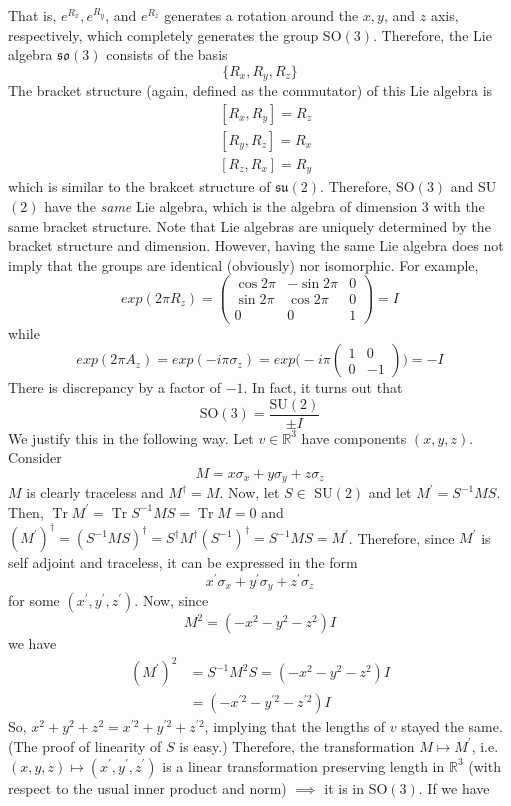 \documentclass{article}
\DeclareMathOperator{\Tr}{Tr}
\theoremstyle{remark}
\theoremstyle{definition}
\begin{document}
That is, $e^{R_x}, e^{R_y}$, and $e^{R_z}$ generates a rotation around the $x, y$, and $z$ axis, respectively, which completely generates the group SO$(3)$. Therefore, the Lie algebra $\mathfrak{so}(3)$ consists of the basis 
\[\{R_x, R_y, R_z\}\]
The bracket structure (again, defined as the commutator) of this Lie algebra is 
\begin{align*}
    & [R_x, R_y] = R_z \\
    & [R_y, R_z] = R_x \\
    & [R_z, R_x] = R_y
\end{align*}
which is similar to the brakcet structure of $\mathfrak{su}(2)$. Therefore, SO$(3)$ and SU$(2)$ have the \textit{same} Lie algebra, which is the algebra of dimension 3 with the same bracket structure. Note that Lie algebras are uniquely determined by the bracket structure and dimension. However, having the same Lie algebra does not imply that the groups are identical (obviously) nor isomorphic. For example, 
\[exp(2\pi R_z) = \begin{pmatrix}
\cos{2\pi} & -\sin{2\pi} & 0 \\
\sin{2\pi} & \cos{2\pi} & 0 \\
0 & 0 & 1
\end{pmatrix} = I\]
while 
\[exp(2\pi A_z) = 
exp(-i \pi \sigma_z) = exp \bigg(-i \pi \begin{pmatrix}
1&0\\0&-1
\end{pmatrix} \bigg) = -I\]
There is discrepancy by a factor of $-1$. In fact, it turns out that
\[\text{SO}(3) = \frac{\text{SU}(2)}{\pm I}\]
We justify this in the following way. Let $v \in \mathbb{R}^3$ have components $(x, y, z)$. Consider
\[M = x \sigma_x + y \sigma_y + z \sigma_z\]
$M$ is clearly traceless and $M^\dagger = M$. Now, let $S \in$ SU$(2)$ and let $M^\prime = S^{-1} M S$. Then, $\Tr{M^\prime} = \Tr{S^{-1} M S} = \Tr{M} = 0$ and $(M^\prime)^\dagger = (S^{-1} M S)^\dagger = S^\dagger M^\dagger (S^{-1})^\dagger = S^{-1} M S = M^\prime$. Therefore, since $M^\prime$ is self adjoint and traceless, it can be expressed in the form
\[x^\prime \sigma_x + y^\prime \sigma_y + z^\prime \sigma_z\]
for some $(x^\prime, y^\prime, z^\prime)$. Now, since 
\[M^2 = (-x^2 - y^2 - z^2) I\]
we have 
\begin{align*}
    (M^\prime)^2 & = S^{-1} M^2 S = (-x^2 - y^2 - z^2) I \\
    & = (-x^{\prime 2} - y^{\prime 2} - z^{\prime 2}) I 
\end{align*}
So, $x^2 + y^2 + z^2 = x^{\prime 2} + y^{\prime 2} + z^{\prime 2}$, implying that the lengths of $v$ stayed the same. (The proof of linearity of $S$ is easy.) Therefore, the transformation $M \mapsto M^\prime$, i.e. $(x, y, z) \mapsto (x^\prime, y^\prime, z^\prime)$ is a linear transformation preserving length in $\mathbb{R}^3$ (with respect to the usual inner product and norm) $\implies$ it is in SO$(3)$. If we have
\end{document}
